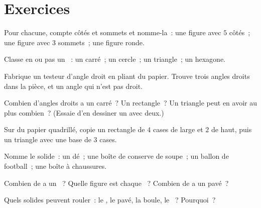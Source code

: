 \section{Exercices}

\begin{exercise}[$\star$]\label{exo:g2:shapes:1}
Pour chacune, compte côtés et sommets et nomme-la~: une figure
avec $5$ côtés~; une figure avec $3$ sommets~; une figure ronde.
\end{exercise}

\begin{exercise}[$\star$]\label{exo:g2:shapes:2}
Classe en \guillemotleft{}  \guillemotright{} ou
\guillemotleft{} pas un  \guillemotright{}~: un carré~; un
cercle~; un triangle~; un hexagone.
\end{exercise}

\begin{exercise}[$\star$]\label{exo:g2:shapes:3}
Fabrique un testeur d'angle droit en pliant du papier. Trouve trois
angles droits dans la pièce, et un angle qui n'est pas droit.
\end{exercise}

\begin{exercise}[$\star$]\label{exo:g2:shapes:4}
Combien d'angles droits a un carré~? Un rectangle~? Un triangle
peut en avoir au plus combien~? (Essaie d'en dessiner un avec
deux.)
\end{exercise}

\begin{exercise}[$\star$]\label{exo:g2:shapes:5}
Sur du papier quadrillé, copie un rectangle de $4$ cases de large
et $2$ de haut, puis un triangle avec une base de $3$ cases.
\end{exercise}

\begin{exercise}[$\star$]\label{exo:g2:shapes:6}
Nomme le solide~: un dé~; une boîte de conserve de soupe~; un
ballon de football~; une boîte à chaussures.
\end{exercise}

\begin{exercise}[$\star$]\label{exo:g2:shapes:7}
Combien de  a un ~? Quelle figure est chaque ~? Combien
de  a un pavé~?
\end{exercise}

\begin{exercise}[$\star$]\label{exo:g2:shapes:8}
Quels solides peuvent rouler~: le , le pavé, la boule, le
~? Pourquoi~?
\end{exercise}

